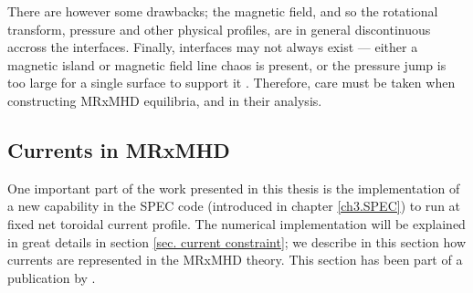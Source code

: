 \documentclass[my_thesis.tex]{subfiles}
\begin{document}
There are however some drawbacks; the magnetic field, and so the rotational transform, pressure and other physical profiles, are in general discontinuous accross the interfaces. Finally, interfaces may not always exist --- either a magnetic island or magnetic field line chaos is present, or the pressure jump is too large for a single surface to support it \citep{Qu2021}. Therefore, care must be taken when constructing MRxMHD equilibria, and in their analysis. 




\subsection{Currents in MRxMHD}
One important part of the work presented in this thesis is the implementation of a new capability in the SPEC code (introduced in chapter \ref{ch3.SPEC}) to run at fixed net toroidal current profile. The numerical implementation will be explained in great details in section \ref{sec. current constraint}; we describe in this section how currents are represented in the MRxMHD theory. This section has been part of a publication by \citet{Baillod2021}.
\end{document}
